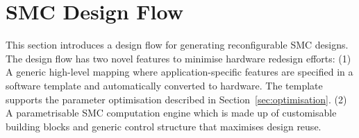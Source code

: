 

\section{SMC Design Flow}
\label{sec:design}

This section introduces a design flow for generating reconfigurable SMC 
designs. The design flow has two novel features to minimise hardware redesign efforts:
(1) A generic high-level mapping where application-specific features are specified in a software template and automatically converted to hardware.
The template supports the parameter optimisation described in Section~\ref{sec:optimisation}.
(2) A parametrisable SMC computation engine which is made up of customisable building blocks and generic control structure that maximises design reuse.

